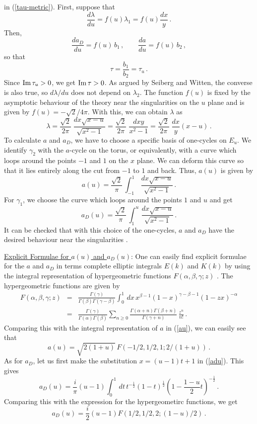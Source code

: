 in (\ref{tau-metric}). First, suppose that 
$$
\frac{d\lambda}{du} = f(u) \lambda_{1} = f(u) \frac{dx}{y}\,.
$$
Then,
$$
\frac{da_{D}}{du} = f(u)\,b_1\,,\qquad \frac{da}{du} = f(u)\,b_2\,,
$$
so that
$$
\tau = \frac{b_1}{b_2} = \tau_u\,. 
$$
Since ${\rm Im}\,\tau_u > 0$, we get ${\rm Im}\,\tau >0$. As argued by
Seiberg and Witten, the converse is also true, so $d\lambda/du$ does
not depend on $\lambda_2$. The function $f(u)$ is fixed by the
asymptotic behaviour of the theory near the singularities on the $u$
plane and is given by $f(u)=-\sqrt{2}/4\pi$. With this, we can obtain
$\lambda$ as
$$
\lambda=\frac{\sqrt{2}}{2\pi}\;\frac{dx\sqrt{x-u}}{\sqrt{x^2-1}}=  
\frac{\sqrt{2}}{2\pi}\;\frac{dx y}{x^2-1}=\frac{\sqrt{2}}{2\pi}\;
\frac{dx}{y} (x-u) \,.
$$
To calculate $a$ and $a_D$, we have to choose a specific basis of 
one-cycles on $E_u$. We identify $\gamma_2$ with the $a$-cycle on the
torus, or equivalently, with a curve which loops around the points
$-1$ and $1$ on the $x$ plane. We can deform this curve so that it lies
entirely along the cut from $-1$ to $1$ and back. Thus, $a(u)$ is
given by 
\begin{equation}
a(u)=\frac{\sqrt{2}}{\pi}\,\int_{-1}^1\,\frac{dx\sqrt{x-u}}{\sqrt{x^2-1}}\,.
\label{au}
\end{equation}
For $\gamma_1$, we choose the curve which loops around the points $1$
and $u$ and get
\begin{equation}
a_D(u)=\frac{\sqrt{2}}{\pi}\,\int_{1}^u\,\frac{dx\sqrt{x-u}}{\sqrt{x^2-1}}\,.
\label{adu}
\end{equation}
It can be checked that with this choice of the one-cycles, $a$ and
$a_D$ have the desired  behaviour near the singularities \cite{SW-I}. 

\noindent\underline{Explicit Formulae for $a(u)$ and $a_D(u)$}:
One can easily find explicit formulae for the $a$ and $a_D$ in terms
complete elliptic integrals $E(k)$ and $K(k)$ by using the integral
representation of hypergeometric functions $F(\alpha,\beta,\gamma;z)$ 
\cite{GR}. The hypergeometric functions are given by
\begin{eqnarray}
F(\alpha,\beta,\gamma;z)&=& \frac{\Gamma(\gamma)}{\Gamma(\beta)
\Gamma(\gamma-\beta)}\int_0^1\,dx\,x^{\beta-1} (1-x)^{\gamma-\beta-1}
(1-zx)^{-\alpha}\nonumber\\ 
&=& \frac{\Gamma(\gamma)}{\Gamma(\alpha)\Gamma(\beta)}\sum_{n\geq 0}
\frac{\Gamma(\alpha +n)\Gamma(\beta +n)}{\Gamma(\gamma +n)}\,
\frac{z^n}{n!}\,.\nonumber
\end{eqnarray}
Comparing this with the integral representation of $a$ in (\ref{au}),
we can easily see that 
$$
a(u)=\sqrt{2(1+u)}\, F\left(-1/2, 1/2, 1; 2/(1+u)\right)\,.
$$
As for $a_D$, let us first make the substitution $x=(u-1)t+1$ in 
(\ref{adu}). This gives
$$
a_D(u)=\frac{i}{\pi} (u-1)\int_0^1\,dt\,t^{-\frac{1}{2}}
(1-t)^{\frac{1}{2}} (1-\frac{1-u}{2} t)^{-\frac{1}{2}}\,. 
$$
Comparing this with the expression for the hypergeometirc functions,
we get
$$
a_D(u)=\frac{i}{2} (u-1) F\left(1/2, 1/2, 2; (1-u)/2\right)\,.
$$

